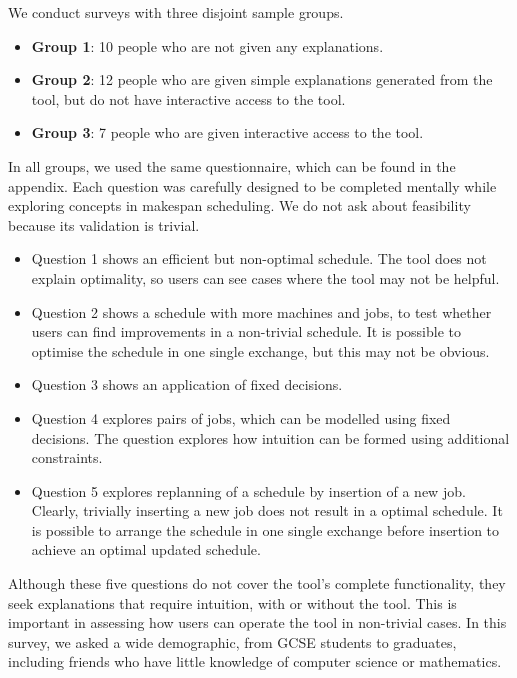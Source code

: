 We conduct surveys with three disjoint sample groups.

\begin{itemize}
	\item \textbf{Group 1}: 10 people who are not given any explanations.
	\item \textbf{Group 2}: 12 people who are given simple explanations generated from the tool, but do not have interactive access to the tool.
	\item \textbf{Group 3}: 7 people who are given interactive access to the tool.
\end{itemize}

In all groups, we used the same questionnaire, which can be found in the appendix. Each question was carefully designed to be completed mentally while exploring concepts in makespan scheduling. We do not ask about feasibility because its validation is trivial. 

\begin{itemize}
	\item Question 1 shows an efficient but non-optimal schedule. The tool does not explain optimality, so users can see cases where the tool may not be helpful.
	\item Question 2 shows a schedule with more machines and jobs, to test whether users can find improvements in a non-trivial schedule. It is possible to optimise the schedule in one single exchange, but this may not be obvious.
	\item Question 3 shows an application of fixed decisions.
	\item Question 4 explores pairs of jobs, which can be modelled using fixed decisions. The question explores how intuition can be formed using additional constraints.
	\item Question 5 explores replanning of a schedule by insertion of a new job. Clearly, trivially inserting a new job does not result in a optimal schedule. It is possible to arrange the schedule in one single exchange before insertion to achieve an optimal updated schedule.
\end{itemize}

Although these five questions do not cover the tool's complete functionality, they seek explanations that require intuition, with or without the tool. This is important in assessing how users can operate the tool in non-trivial cases. In this survey, we asked a wide demographic, from GCSE students to graduates, including friends who have little knowledge of computer science or mathematics.

